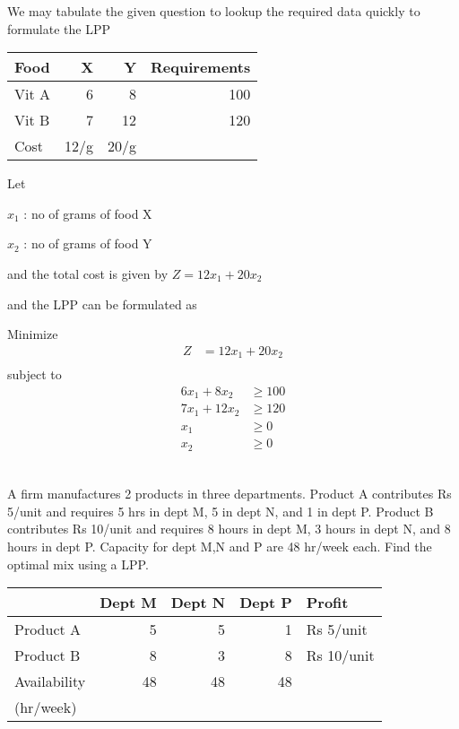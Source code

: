 \documentclass[12pt]{article}
\begin{document}
We may tabulate the given question to lookup the required data quickly to formulate the LPP


\begin{center}
\begin{tabular}{lrrr}
\hline
 Food   &     X  &     Y  &  Requirements  \\
\hline
 Vit A  &     6  &     8  &           100  \\
 Vit B  &     7  &    12  &           120  \\
\hline
 Cost   &  12/g  &  20/g  &                \\
\hline
\end{tabular}
\end{center}



Let 

$x_1$ : no of grams of food X

$x_2$ : no of grams of food Y

and the total cost is given by $Z=12x_1 + 20x_2$

and the LPP can be formulated as 

Minimize 
\begin{align*}
Z            & = 12x_1 + 20x_2 \\
\end{align*}
subject to 
\begin{align*}
6x_1 + 8x_2  & \ge 100         \\
7x_1 + 12x_2 & \ge 120         \\
x_1          & \ge 0           \\
x_2          & \ge 0           \\
\end{align*}
\subsection{}

A firm manufactures 2 products in three departments. Product A contributes Rs 5/unit and requires 5 hrs in dept M, 5 in dept N, and 1 in dept P. Product B contributes Rs 10/unit and requires 8 hours in dept M, 3 hours in dept N, and 8 hours in dept P. Capacity for dept M,N and P are 48 hr/week each. Find the optimal mix using a LPP.

\begin{center}
\begin{tabular}{lrrrl}
\hline
               &  Dept M  &  Dept N  &  Dept P  &  Profit      \\
\hline
 Product A     &       5  &       5  &       1  &  Rs 5/unit   \\
 Product B     &       8  &       3  &       8  &  Rs 10/unit  \\
\hline
 Availability  &      48  &      48  &      48  &              \\
 (hr/week)     &          &          &          &              \\
\hline
\end{tabular}
\end{center}
\end{document}
